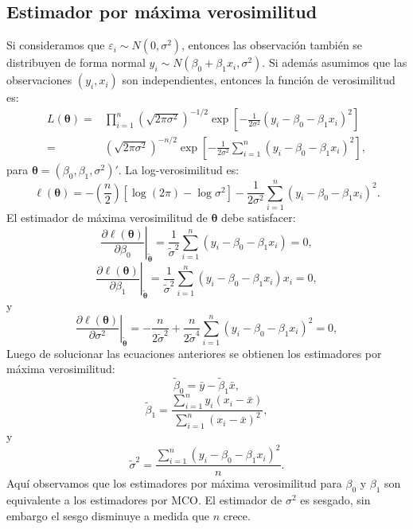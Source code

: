 \documentclass[
]{article}
\begin{document}
\hypertarget{estimador-por-muxe1xima-verosimilitud}{%
\subsection{Estimador por máxima verosimilitud}\label{estimador-por-muxe1xima-verosimilitud}}

Si consideramos que \(\varepsilon_{i}\sim N(0,\sigma^{2})\), entonces las observación también se distribuyen de forma normal \(y_{i}\sim N(\beta_{0}+\beta_{1}x_{i},\sigma^{2})\). Si además asumimos que las observaciones \((y_{i},x_{i})\) son independientes, entonces la función de verosimilitud es:
\begin{equation}
\begin{split}
L(\boldsymbol \theta) =& \prod_{i=1}^{n} \left(\sqrt{2\pi\sigma^{2}} \right)^{-1/2}\exp\left[ - \frac{1}{2\sigma^{2}}(y_{i}-\beta_{0}-\beta_{1}x_{i})^{2} \right] \\
=& \left( \sqrt{2\pi\sigma^{2}} \right)^{-n/2}\exp\left[ - \frac{1}{2\sigma^{2}} \sum_{i=1}^{n}(y_{i}-\beta_{0}-\beta_{1}x_{i})^{2}\right],
\end{split}
\nonumber
\end{equation}
para \(\boldsymbol \theta=(\beta_{0},\beta_{1},\sigma^{2})'\). La log-verosimilitud es:
\[
\ell (\boldsymbol \theta) = - \left(\frac{n}{2}\right)\left[ \log (2 \pi) - \log \sigma^{2}\right] - \frac{1}{2\sigma^{2}}\sum_{i=1}^{n}(y_{i} - \beta_{0}-\beta_{1}x_{i})^{2}. 
\]
El estimador de máxima verosimilitud de \(\boldsymbol \theta\) debe satisfacer:
\[
\left. \frac{\partial \ell(\boldsymbol \theta)}{\partial \beta_{0}} \right|_{\widetilde{\boldsymbol \theta}} = \frac{1}{\widetilde{\sigma}^{2}}\sum_{i=1}^{n}(y_{i} - \beta_{0}-\beta_{1}x_{i}) = 0,
\]
\[
\left. \frac{\partial \ell(\boldsymbol \theta)}{\partial \beta_{1}} \right|_{\widetilde{\boldsymbol \theta}} = \frac{1}{\widetilde{\sigma}^{2}}\sum_{i=1}^{n}(y_{i} - \beta_{0}-\beta_{1}x_{i})x_{i} = 0,
\]
y
\[
\left. \frac{\partial \ell(\boldsymbol \theta)}{\partial \sigma^{2}} \right|_{\widetilde{\boldsymbol \theta}} = -\frac{n}{2\widetilde{\sigma}^{2}} + \frac{n}{2\widetilde{\sigma}^{4}}
\sum_{i=1}^{n}(y_{i} - \beta_{0}-\beta_{1}x_{i})^{2} = 0,
\]
Luego de solucionar las ecuaciones anteriores se obtienen los estimadores por máxima verosimilitud:
\[
\widetilde{\beta}_{0} = \bar{y} - \widetilde{\beta}_{1}\bar{x},
\]
\[
\widetilde{\beta}_{1} = \frac{\sum_{i=1}^{n}y_{i}(x_{i}-\bar{x})}{\sum_{i=1}^{n}(x_{i}-\bar{x})^{2}},
\]
y
\[
\widetilde{\sigma}^{2} = \frac{\sum_{i=1}^{n}(y_{i}-\beta_{0}-\beta_{1}x_{i})^{2}}{n}.
\]
Aquí observamos que los estimadores por máxima verosimilitud para \(\beta_{0}\) y \(\beta_{1}\) son equivalente a los estimadores por MCO. El estimador de \(\sigma^{2}\) es sesgado, sin embargo el sesgo disminuye a medida que \(n\) crece.
\end{document}
